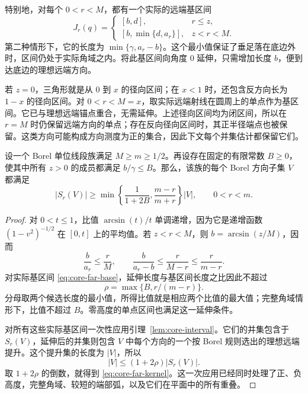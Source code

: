 

特别地，对每个 $0<r<M$，都有一个实际的远端基区间
\begin{equation}
 J_r(q)=
 \begin{cases}
 [b,d],&r\leq z,\\
 [b,\min\{d,a_r\}],&z<r<M.
 \end{cases}
\label{eq:core-far-base}
\end{equation}
第二种情形下，它的长度为 $\min\{\gamma,a_r-b\}$。这个最小值保证了垂足落在底边外时，区间仍处于实际角域之内。将此基区间向角度 $0$ 延伸，只需增加长度 $b$，便到达底边的理想远端方向。

若 $z=0$，三角形就是从 $0$ 到 $x$ 的径向区间；在 $x<1$ 时，还包含反方向长为 $1-x$ 的径向区间。对 $0<r<M=x$，取实际远端射线在圆周上的单点作为基区间。它已与理想远端锚点重合，无需延伸。上述径向区间均为闭区间，所以在 $r=M$ 时仍保留远端方向的单点；存在反向径向区间时，其正半径端点也被保留。这类方向可能构成方向测度为正的集合，因此下文每个并集估计都保留它们。

\begin{lemma}[远端截面下界]
\label{lem:core-far}
设一个 Borel 单位线段族满足 $M\geq m\geq1/2$。再设存在固定的有限常数 $B\geq0$，使其中所有 $z>0$ 的成员都满足 $b/\gamma\leq B$。那么，该族的每个 Borel 方向子集 $V$ 都满足
\begin{equation}
 |S_r(V)|\geq
 \min\left\{\frac1{1+2B},\frac{m-r}{m+r}\right\}|V|,
                   \qquad 0<r<m.
\label{eq:core-far-kernel}
\end{equation}
\end{lemma}

\begin{proof}
对 $0<t\leq1$，比值 $\arcsin(t)/t$ 单调递增，因为它是递增函数 $(1-v^2)^{-1/2}$ 在 $[0,t]$ 上的平均值。若 $z<r<M$，则 $b=\arcsin(z/M)$，因而
\[
 \frac{b}{a_r}\leq\frac rM,\qquad
 \frac{b}{a_r-b}\leq\frac r{M-r}\leq\frac r{m-r}.
\]
对实际基区间 \eqref{eq:core-far-base}，延伸长度与基区间长度之比因此不超过
\[
                   \rho=\max\{B,r/(m-r)\}.
\]
分母取两个候选长度的最小值，所得比值就是相应两个比值的最大值；完整角域情形下，比值不超过 $B$。零高度的单点区间也满足这一延伸条件。

对所有这些实际基区间一次性应用引理~\ref{lem:core-interval}。它们的并集包含于 $S_r(V)$，延伸后的并集则包含 $V$ 中每个方向的一个按 Borel 规则选出的理想远端提升。这个提升集的长度为 $|V|$，所以
\[
                  |V|\leq(1+2\rho)|S_r(V)|.
\]
取 $1+2\rho$ 的倒数，就得到 \eqref{eq:core-far-kernel}。这一次应用已经同时处理了正、负高度，完整角域、较短的端部弧，以及它们在平面中的所有重叠。
\end{proof}

